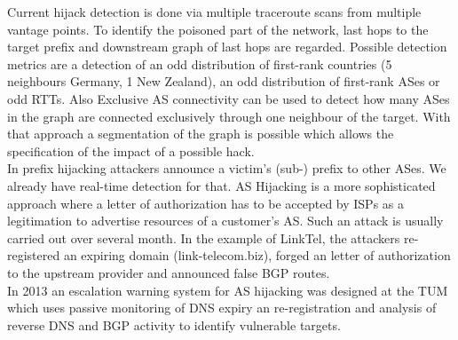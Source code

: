 Current hijack detection is done via multiple traceroute scans from multiple vantage points.
To identify the poisoned part of the network, last hops to the target prefix and downstream graph of last hops are regarded.
Possible detection metrics are a detection of an odd distribution of first-rank countries (5 neighbours Germany, 1 New Zealand), an odd distribution of first-rank ASes or odd RTTs.
Also Exclusive AS connectivity can be used to detect how many ASes in the graph are connected exclusively through one neighbour of the target.
With that approach a segmentation of the graph is possible which allows the specification of the impact of a possible hack.\\

In prefix hijacking attackers announce a victim's (sub-) prefix to other ASes.
We already have real-time detection for that.
AS Hijacking is a more sophisticated approach where a letter of authorization has to be accepted by ISPs as a legitimation to advertise resources of a customer's AS.
Such an attack is usually carried out over several month.
In the example of LinkTel, the attackers re-registered an expiring domain (link-telecom.biz), forged an letter of authorization to the upstream provider and announced false BGP routes.\\
In 2013 an escalation warning system for AS hijacking was designed at the TUM which uses passive monitoring of DNS expiry an re-registration and analysis of reverse DNS and BGP activity to identify vulnerable targets.
